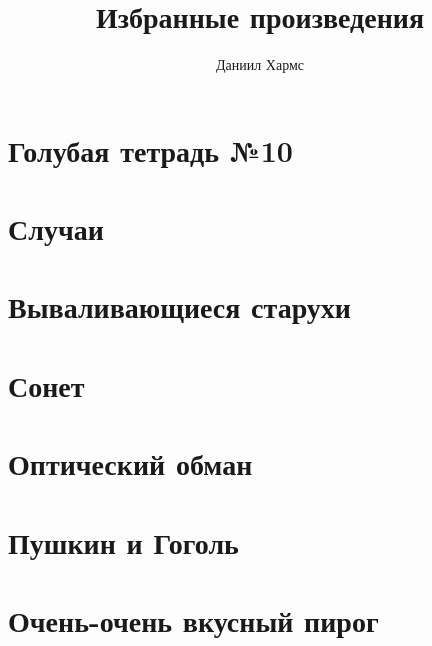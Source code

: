\documentclass[a4paper,12pt]{article}
\title{Избранные произведения}
\author{Даниил Хармс}
\date{}
\begin{document}
\maketitle

\section{Голубая тетрадь №10}


\section{Случаи}


\section{Вываливающиеся старухи}


\section{Сонет}


\section{Оптический обман}


\section{Пушкин и Гоголь}


\section{Очень-очень вкусный пирог}

\end{document}

